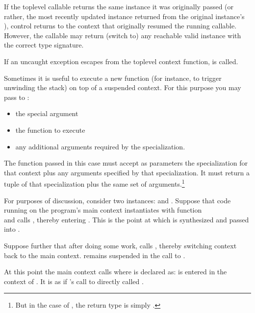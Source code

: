 If the toplevel callable returns the same \ectx instance it was originally
passed (or rather, the most recently updated instance returned from the
original instance's \op), control returns to the context that originally
resumed the running callable. However, the callable may return (switch to)
any reachable valid \ectx instance with the correct type signature.


If an uncaught exception escapes from the toplevel context function,
 is called.


Sometimes it is useful to execute a new function (for instance, to trigger
unwinding the stack) on top of a suspended context. For this purpose you may
pass to \ectxop:

\begin{itemize}
  \item the special argument 
  \item the function to execute
  \item any additional arguments required by the \ectx specialization.
\end{itemize}

The function passed in this case must accept as parameters the \ectx
specialization for that context plus any arguments specified by that
specialization. It must return a tuple of that \ectx specialization plus the
same set of arguments.\footnote{But in the case
of , the return type is
simply .}

For purposes of discussion, consider two 
instances:  and . Suppose that code running
on the program's main context instantiates  with function\\
 and calls , thereby
entering . This is the point at which  is synthesized
and passed into .

Suppose further that after doing some work,  calls ,
thereby switching context back to the main context.  remains
suspended in the call to .

At this point the main context calls 
where  is declared as:
\newline
{}
\newline
{} is entered in the context of . It is as if 's call
to  directly called .

